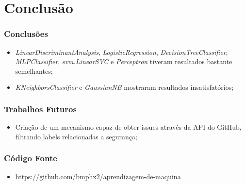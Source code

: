 \section[Conclusão]{Conclusão}

\begin{frame}
  \frametitle{Conclusões}
  \begin{itemize}
    \item \textit{LinearDiscriminantAnalysis}, \textit{LogisticRegression}, \textit{DecisionTreeClassifier}, \textit{MLPClassifier}, \textit{svm.LinearSVC} e \textit{Perceptron} tiveram resultados bastante semelhantes;
    \item \textit{KNeighborsClassifier} e \textit{GaussianNB} mostraram resultados insatisfatórios;
  \end{itemize}
\end{frame}

\begin{frame}
  \frametitle{Trabalhos Futuros}
  \begin{itemize}
    \item Criação de um mecanismo capaz de obter issues através da API do GitHub, filtrando labels relacionadas a segurança;
  \end{itemize}
\end{frame}

\begin{frame}
  \frametitle{Código Fonte}
  \begin{itemize}
    \item https://github.com/bmphx2/aprendizagem-de-maquina
  \end{itemize}
\end{frame}